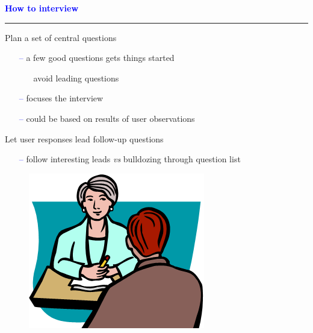 \documentclass[pdf]{beamer}
\begin{document}
{%
{
\begin{frame}
	\vspace{8mm}
	\textcolor{Blue}{\textbf{\large{How to interview}}}
    \textcolor{red}{\rule{10cm}{1mm}}
    Plan a set of central questions
    \begin{itemize}
      \item[\textcolor{Blue}{--}] a few good questions gets things started
      \begin{itemize}
      	\item[\textcolor{Blue}{\textbullet}] avoid leading questions
      \end{itemize}
      \item[\textcolor{Blue}{--}] focuses the interview
      \item[\textcolor{Blue}{--}] could be based on results of user observations
    \end{itemize}
    \bigskip
    Let user responses lead follow-up questions
    \begin{itemize}
      \item[\textcolor{Blue}{--}] follow interesting leads \textit{vs} bulldozing through question list
    \end{itemize}
    \begin{figure}[b]
    	\includegraphics[scale = 0.4, right]{21_Imagine.png}
    \end{figure}
\end{frame}}



}
\end{document}
